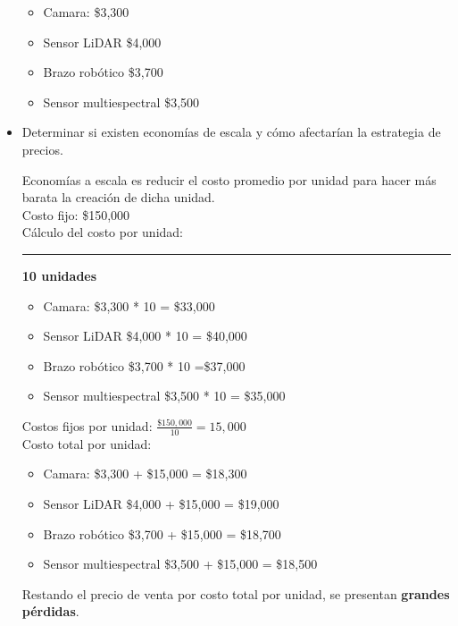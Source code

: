 \documentclass[letterpaper,12pt]{article}
\begin{document}
\begin{sloppypar}
\begin{itemize}
\begin{center}
        \begin{itemize}
            \item Camara: \$3,300
            \item Sensor LiDAR \$4,000
            \item Brazo robótico \$3,700
            \item Sensor multiespectral \$3,500
        \end{itemize}
        
    \end{center}
    \item Determinar si existen economías de escala y cómo afectarían la estrategia
    de precios.
    \begin{center}
        Economías a escala es reducir el costo promedio por unidad para hacer más barata la creación de dicha unidad. 
        \vspace{0.3cm}\\ 
        Costo fijo: \$150,000 \\ 
        Cálculo del costo por unidad:
        \vspace{0.3cm}\\ 
        \hrule 
        \textbf{10 unidades }
        \begin{itemize}
            \centering
            \item Camara: \$3,300 * 10 = \$33,000
            \item Sensor LiDAR \$4,000 * 10 = \$40,000
            \item Brazo robótico \$3,700 * 10 =\$37,000
            \item Sensor multiespectral \$3,500 * 10 = \$35,000
        \end{itemize}
        Costos fijos por unidad: $\displaystyle\frac{\$150,000}{10} = 15,000$
        \vspace{0.3cm}\\ 
        Costo total por unidad:
        \begin{itemize}
            \centering
            \item Camara: \$3,300 + \$15,000 = \$18,300
            \item Sensor LiDAR \$4,000 + \$15,000 = \$19,000
            \item Brazo robótico \$3,700 + \$15,000 = \$18,700
            \item Sensor multiespectral \$3,500 + \$15,000 = \$18,500
        \end{itemize} 
        Restando el precio de venta por costo total por unidad, se presentan \textbf{grandes pérdidas}.

\end{center}
\end{itemize}
\end{sloppypar}
\end{document}
